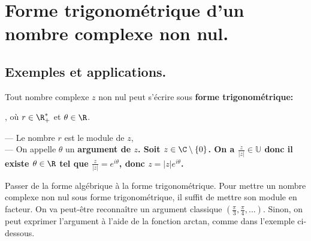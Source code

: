 \documentclass[11pt]{article}
\newcommand*{\U}{\mathbb{U}}
\begin{document}
\section{Forme trigonométrique d'un nombre complexe non nul.}

\subsection{Exemples et applications.}

\begin{prop}{}{}
    Tout nombre complexe $z$ non nul peut s'écrire sous \bf{forme trigonométrique}:
    \begin{center}
        , où $r\in\R^*_+$ et $\theta\in\R$.
    \end{center}
    --- Le nombre $r$ est le module de $z$,\\
    --- On appelle $\theta$ un \bf{argument} de $z$.
    \tcblower
    Soit $z\in\C\setminus\{0\}$. On a $\frac{z}{|z|}\in\U$ donc il existe $\theta\in\R$ tel que $\frac{z}{|z|}=e^{i\theta}$, donc $z=|z|e^{i\theta}$.
\end{prop}

\begin{meth}{Passer de la forme algébrique à la forme trigonométrique.}{}
    Pour mettre un nombre complexe non nul sous forme trigonométrique, il suffit de mettre son module en facteur. On va peut-être reconnaître un argument classique $(\frac{\pi}{3},\frac{\pi}{4},...)$. Sinon, on peut exprimer l'argument à l'aide de la fonction arctan, comme dans l'exemple ci-dessous.
\end{meth}
\end{document}
